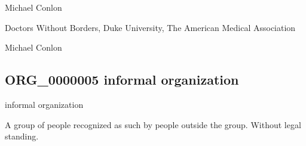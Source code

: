 \documentclass[letterpaper,10pt,english]{sphinxmanual}
\begin{document}
\begin{sphinxShadowBox}

\sphinxAtStartPar
Michael Conlon 
\end{sphinxShadowBox}

\begin{sphinxShadowBox}

\sphinxAtStartPar
Doctors Without Borders, Duke University, The American Medical Association
\end{sphinxShadowBox}

\begin{sphinxShadowBox}

\sphinxAtStartPar
Michael Conlon 
\end{sphinxShadowBox}
\begin{quote}

\ignorespaces \end{quote}


\subsection{ORG\_0000005 \sphinxhyphen{} informal organization}
\label{\detokenize{doc-ORG_0000005:org-0000005-informal-organization}}\label{\detokenize{doc-ORG_0000005:index-0}}\label{\detokenize{doc-ORG_0000005::doc}}
\begin{sphinxShadowBox}

\sphinxAtStartPar
informal organization
\end{sphinxShadowBox}

\begin{sphinxShadowBox}

\sphinxAtStartPar
{\hyperref[\detokenize{doc-ORG_0000001::doc}]{}}
\end{sphinxShadowBox}

\begin{sphinxShadowBox}

\sphinxAtStartPar
A group of people recognized as such by people outside the group. Without legal standing.
\end{sphinxShadowBox}
\end{document}
